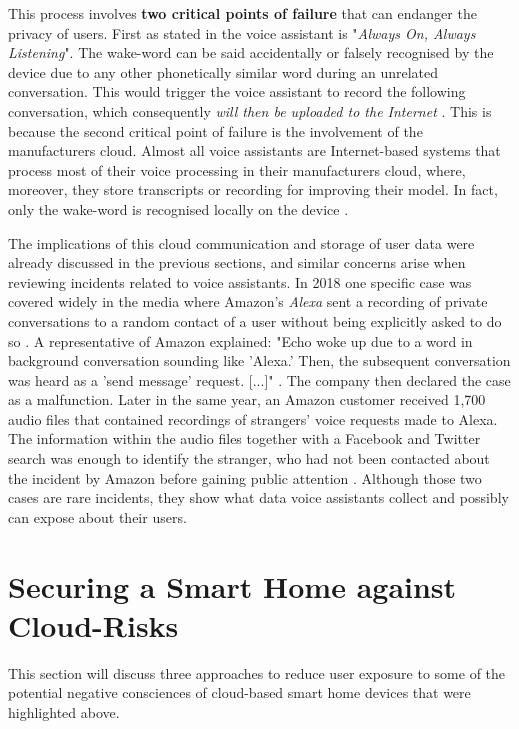 This process involves \textbf{two critical points of failure} that can endanger the privacy of users. First as stated in \cite{SHPA-10.1145/3412383} the voice assistant is "\textit{Always On, Always Listening}". The wake-word can be said accidentally or falsely recognised by the device due to any other phonetically similar word during an unrelated conversation. This would trigger the voice assistant to record the following conversation, which consequently \textit{will then be uploaded to the Internet} \cite{SHPA-10.1145/3412383}. This is because the second critical point of failure is the involvement of the manufacturers cloud. Almost all voice assistants are Internet-based systems that process most of their voice processing in their manufacturers cloud, where, moreover, they store transcripts or recording for improving their model. In fact, only the wake-word is recognised locally on the device \cite{SHPA-10.1145/3412383}\cite{BertkoChris2017HSH:}.

The implications of this cloud communication and storage of user data were already discussed in the previous sections, and similar concerns arise when reviewing incidents related to voice assistants. In 2018 one specific case was covered widely in the media where Amazon's \textit{Alexa} sent a recording of private conversations to a random contact of a user without being explicitly asked to do so \cite{Horton2018AlexaRecordsConversation}. A representative of Amazon explained: "Echo woke up due to a word in background conversation sounding like 'Alexa.' Then, the subsequent conversation was heard as a 'send message' request. [...]" \cite{Horton2018AlexaRecordsConversation}. The company then declared the case as a malfunction. Later in the same year, an Amazon customer received 1,700 audio files that contained recordings of strangers' voice requests made to Alexa. The information within the audio files together with a Facebook and Twitter search was enough to identify the stranger, who had not been contacted about the incident by Amazon before gaining public attention \cite{Ingber2018AlexaAudioFiles}. Although those two cases are rare incidents, they show what data voice assistants collect and possibly can expose about their users.



\section{Securing a Smart Home against Cloud-Risks}
This section will discuss three approaches to reduce user exposure to some of the potential negative consciences of cloud-based smart home devices that were highlighted above.

